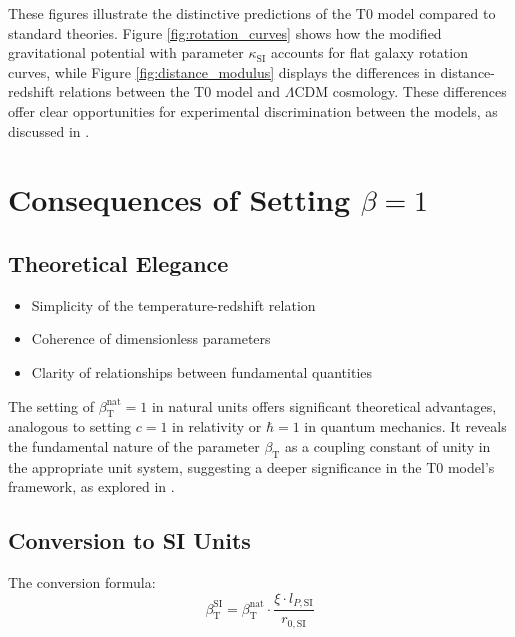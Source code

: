 \documentclass[12pt,a4paper]{article}
\newcommand{\betaT}{\beta_{\text{T}}}
\begin{document}
	These figures illustrate the distinctive predictions of the T0 model compared to standard theories. Figure \ref{fig:rotation_curves} shows how the modified gravitational potential with parameter \(\kappa_{\text{SI}}\) accounts for flat galaxy rotation curves, while Figure \ref{fig:distance_modulus} displays the differences in distance-redshift relations between the T0 model and \(\Lambda\)CDM cosmology. These differences offer clear opportunities for experimental discrimination between the models, as discussed in \cite{pascher_messdifferenzen_2025}.
	
	\section{Consequences of Setting \(\beta = 1\)}
	\label{sec:consequences_beta}
	
	\subsection{Theoretical Elegance}
	\label{subsec:theoretical_elegance}
	
	\begin{itemize}
		\item Simplicity of the temperature-redshift relation
		\item Coherence of dimensionless parameters
		\item Clarity of relationships between fundamental quantities
	\end{itemize}
	
	The setting of \(\betaT^{\text{nat}} = 1\) in natural units offers significant theoretical advantages, analogous to setting \(c = 1\) in relativity or \(\hbar = 1\) in quantum mechanics. It reveals the fundamental nature of the parameter \(\betaT\) as a coupling constant of unity in the appropriate unit system, suggesting a deeper significance in the T0 model's framework, as explored in \cite{pascher_alphabeta_2025}.
	
	\subsection{Conversion to SI Units}
	\label{subsec:conversion_to_si}
	
	The conversion formula:
	\begin{equation}
		\betaT^{\text{SI}} = \betaT^{\text{nat}} \cdot \frac{\xi \cdot l_{P,\text{SI}}}{r_{0,\text{SI}}}
	\end{equation}
	
\end{document}
